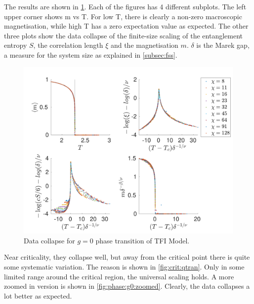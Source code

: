 The results are shown in \cref{fig:phase:g0:full}. Each of the figures has 4 different subplots. The left upper corner shows m vs T. For low T, there is clearly a non-zero macroscopic magnetisation, while high T has a zero expectation value as expected. The other three plots show the data collapse of the finite-size scaling of the entanglement entropy $S$, the correlation length $\xi$ and the magnetisation $m$. $\delta$ is the Marek gap, a measure for the system size as explained in \cref{subsec:fss}.
\begin{figure}[!htbp]
    \center
    \includegraphics[width=\textwidth]{Figuren/phasediag/g0/Full.pdf}
    \caption{ Data collapse for $g=0$ phase transition of \Gls{TFI} Model. }
    \label{fig:phase:g0:full}
\end{figure}
Near criticality, they collapse well, but away from the critical point there is quite some systematic variation. The reason is shown in \cref{fig:crit:qtran}. Only in some limited range around the critical region, the universal scaling holds. A more zoomed in version is shown in \cref{fig:phase:g0:zoomed}. Clearly, the data collapses a lot better as expected.
